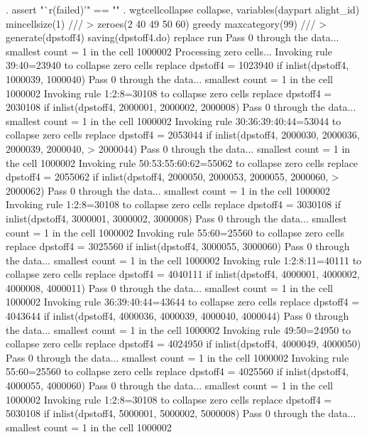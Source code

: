. assert "`r(failed)'" == ""      
{\smallskip}
. wgtcellcollapse collapse, variables(daypart alight_id) mincellsize(1) ///
>         zeroes(2 40 49 50 60) greedy maxcategory(99) ///
>         generate(dpstoff4) saving(dpstoff4.do) replace run
Pass 0 through the data...
  smallest count = 1 in the cell      1000002
{\smallskip}
Processing zero cells...
{\smallskip}
  Invoking rule 39:40=23940 to collapse zero cells
  replace dpstoff4 = 1023940 if inlist(dpstoff4, 1000039, 1000040)
Pass 0 through the data...
  smallest count = 1 in the cell      1000002
  Invoking rule 1:2:8=30108 to collapse zero cells
  replace dpstoff4 = 2030108 if inlist(dpstoff4, 2000001, 2000002, 2000008)
Pass 0 through the data...
  smallest count = 1 in the cell      1000002
  Invoking rule 30:36:39:40:44=53044 to collapse zero cells
  replace dpstoff4 = 2053044 if inlist(dpstoff4, 2000030, 2000036, 2000039, 2000040,
>  2000044)
Pass 0 through the data...
  smallest count = 1 in the cell      1000002
  Invoking rule 50:53:55:60:62=55062 to collapse zero cells
  replace dpstoff4 = 2055062 if inlist(dpstoff4, 2000050, 2000053, 2000055, 2000060,
>  2000062)
Pass 0 through the data...
  smallest count = 1 in the cell      1000002
  Invoking rule 1:2:8=30108 to collapse zero cells
  replace dpstoff4 = 3030108 if inlist(dpstoff4, 3000001, 3000002, 3000008)
Pass 0 through the data...
  smallest count = 1 in the cell      1000002
  Invoking rule 55:60=25560 to collapse zero cells
  replace dpstoff4 = 3025560 if inlist(dpstoff4, 3000055, 3000060)
Pass 0 through the data...
  smallest count = 1 in the cell      1000002
  Invoking rule 1:2:8:11=40111 to collapse zero cells
  replace dpstoff4 = 4040111 if inlist(dpstoff4, 4000001, 4000002, 4000008, 4000011)
Pass 0 through the data...
  smallest count = 1 in the cell      1000002
  Invoking rule 36:39:40:44=43644 to collapse zero cells
  replace dpstoff4 = 4043644 if inlist(dpstoff4, 4000036, 4000039, 4000040, 4000044)
Pass 0 through the data...
  smallest count = 1 in the cell      1000002
  Invoking rule 49:50=24950 to collapse zero cells
  replace dpstoff4 = 4024950 if inlist(dpstoff4, 4000049, 4000050)
Pass 0 through the data...
  smallest count = 1 in the cell      1000002
  Invoking rule 55:60=25560 to collapse zero cells
  replace dpstoff4 = 4025560 if inlist(dpstoff4, 4000055, 4000060)
Pass 0 through the data...
  smallest count = 1 in the cell      1000002
  Invoking rule 1:2:8=30108 to collapse zero cells
  replace dpstoff4 = 5030108 if inlist(dpstoff4, 5000001, 5000002, 5000008)
Pass 0 through the data...
  smallest count = 1 in the cell      1000002
